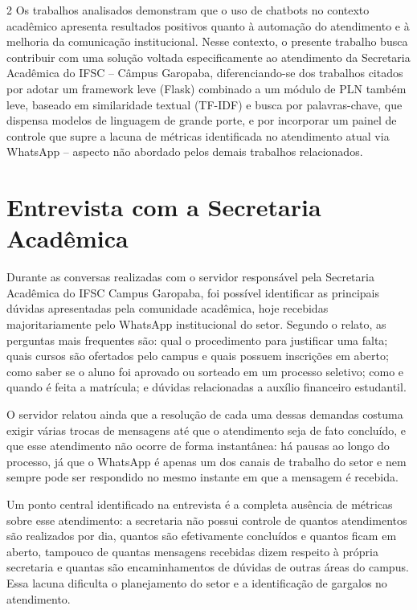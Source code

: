\documentclass[10pt]{article}
\begin{document}
\begin{multicols}{2}
Os trabalhos analisados demonstram que o uso de chatbots no contexto
acadêmico apresenta resultados positivos quanto à automação do
atendimento e à melhoria da comunicação institucional. Nesse contexto, o
presente trabalho busca contribuir com uma solução voltada
especificamente ao atendimento da Secretaria Acadêmica do IFSC -- Câmpus
Garopaba, diferenciando-se dos trabalhos citados por adotar um framework
leve (Flask) combinado a um módulo de PLN também leve, baseado em similaridade textual (TF-IDF) e busca por palavras-chave, que dispensa modelos de linguagem de grande porte, e por incorporar um painel de controle que supre a lacuna de métricas
identificada no atendimento atual via WhatsApp -- aspecto não abordado
pelos demais trabalhos relacionados.

\section{Entrevista com a Secretaria Acadêmica}\label{sec:entrevista}

Durante as conversas realizadas com o servidor responsável pela
Secretaria Acadêmica do IFSC Campus Garopaba, foi possível identificar as
principais dúvidas apresentadas pela comunidade acadêmica, hoje recebidas
majoritariamente pelo WhatsApp institucional do setor. Segundo o relato,
as perguntas mais frequentes são: qual o procedimento para justificar uma
falta; quais cursos são ofertados pelo campus e quais possuem inscrições
em aberto; como saber se o aluno foi aprovado ou sorteado em um processo
seletivo; como e quando é feita a matrícula; e dúvidas relacionadas a
auxílio financeiro estudantil.

O servidor relatou ainda que a resolução de cada uma dessas demandas
costuma exigir várias trocas de mensagens até que o atendimento seja de
fato concluído, e que esse atendimento não ocorre de forma instantânea:
há pausas ao longo do processo, já que o WhatsApp é apenas um dos canais
de trabalho do setor e nem sempre pode ser respondido no mesmo instante
em que a mensagem é recebida.

Um ponto central identificado na entrevista é a completa ausência de
métricas sobre esse atendimento: a secretaria não possui controle de
quantos atendimentos são realizados por dia, quantos são efetivamente
concluídos e quantos ficam em aberto, tampouco de quantas mensagens
recebidas dizem respeito à própria secretaria e quantas são
encaminhamentos de dúvidas de outras áreas do campus. Essa lacuna
dificulta o planejamento do setor e a identificação de gargalos no
atendimento.


\end{multicols}
\end{document}
